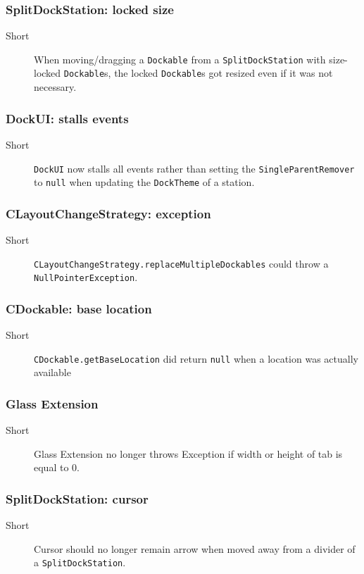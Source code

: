 \documentclass[a4paper,10pt]{article}
\newcommand{\src}[1]{\lstinline[basicstyle=\normalsize\ttfamily,keywordstyle=\normalsize\ttfamily,identifierstyle=\normalsize\ttfamily]|#1|}
\newcommand{\short}{\item[Short]}
\begin{document}
\subsubsection{SplitDockStation: locked size}
\begin{description}
 \short When moving/dragging a \src{Dockable} from a \src{SplitDockStation} with size-locked \src{Dockable}s, the locked \src{Dockable}s got resized even if it was not necessary.
\end{description}

\subsubsection{DockUI: stalls events}
\begin{description}
 \short \src{DockUI} now stalls all events rather than setting the \linebreak \src{SingleParentRemover} to \src{null} when updating the \src{DockTheme} of a station.
\end{description}


\subsubsection{CLayoutChangeStrategy: exception}
\begin{description}
 \short \src{CLayoutChangeStrategy.replaceMultipleDockables} could throw a \linebreak \src{NullPointerException}.
\end{description}

\subsubsection{CDockable: base location}
\begin{description}
 \short \src{CDockable.getBaseLocation} did return \src{null} when a location was actually available
\end{description}

\subsubsection{Glass Extension}
\begin{description}
 \short Glass Extension no longer throws Exception if width or height of tab is equal to 0.
\end{description}

\subsubsection{SplitDockStation: cursor}
\begin{description}
 \short Cursor should no longer remain arrow when moved away from a divider of a \src{SplitDockStation}.
\end{description}
\end{document}
